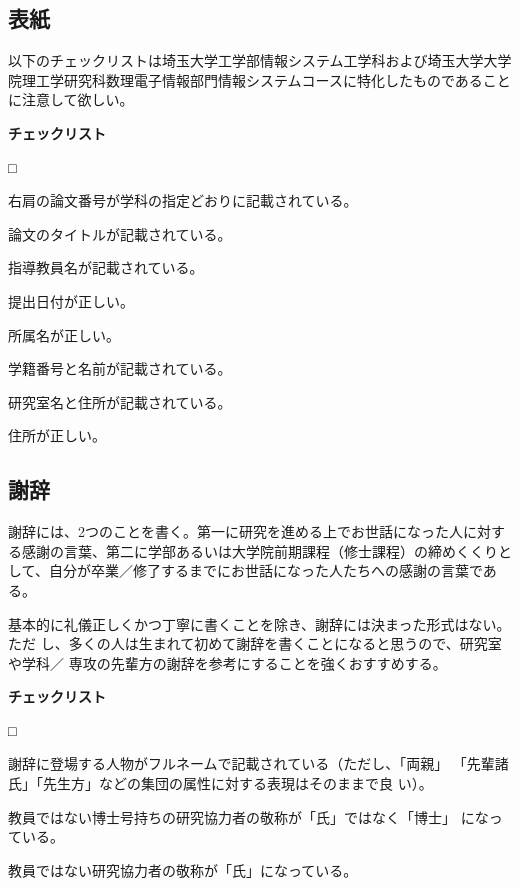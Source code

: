 \documentclass[11pt,a4j]{jsarticle}
\begin{document}
\subsection{表紙}

以下のチェックリストは埼玉大学工学部情報システム工学科および埼玉大学大学
院理工学研究科数理電子情報部門情報システムコースに特化したものであること
に注意して欲しい。

\begin{flushleft}
 {\bf チェックリスト}
\end{flushleft}
\begin{list}%
 {□} %
 {} %
 \item 右肩の論文番号が学科の指定どおりに記載されている。
 \item 論文のタイトルが記載されている。
 \item 指導教員名が記載されている。
 \item 提出日付が正しい。
 \item 所属名が正しい。
 \item 学籍番号と名前が記載されている。
 \item 研究室名と住所が記載されている。
 \item 住所が正しい。
\end{list}

\subsection{謝辞}

謝辞には、2つのことを書く。第一に研究を進める上でお世話になった人に対す
る感謝の言葉、第二に学部あるいは大学院前期課程（修士課程）の締めくくりと
して、自分が卒業／修了するまでにお世話になった人たちへの感謝の言葉である。

基本的に礼儀正しくかつ丁寧に書くことを除き、謝辞には決まった形式はない。ただ
し、多くの人は生まれて初めて謝辞を書くことになると思うので、研究室や学科／
専攻の先輩方の謝辞を参考にすることを強くおすすめする。

\begin{flushleft}
 {\bf チェックリスト}
\end{flushleft}
\begin{list}%
 {□} %
 {} %
 \item 謝辞に登場する人物がフルネームで記載されている（ただし、「両親」
       「先輩諸氏」「先生方」などの集団の属性に対する表現はそのままで良
       い）。
 \item 教員ではない博士号持ちの研究協力者の敬称が「氏」ではなく「博士」
       になっている。
 \item 教員ではない研究協力者の敬称が「氏」になっている。
\end{list}
\end{document}
